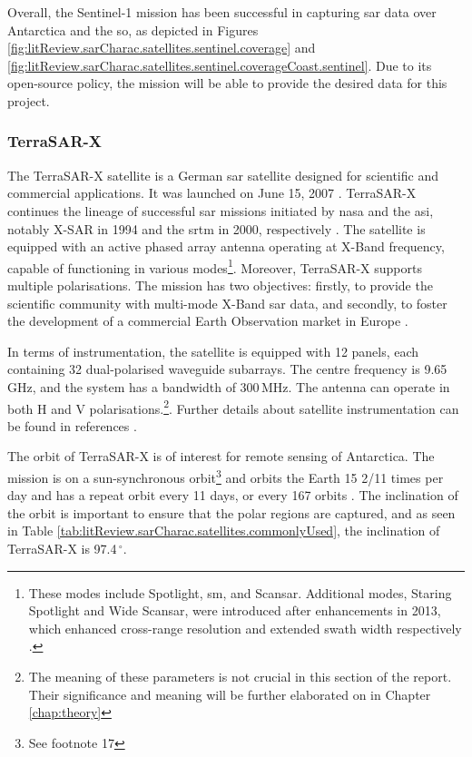 Overall, the Sentinel-1 mission has been successful in capturing \acs{sar} data over Antarctica and the \acs{so}, as depicted in Figures \ref{fig:litReview.sarCharac.satellites.sentinel.coverage} and \ref{fig:litReview.sarCharac.satellites.sentinel.coverageCoast.sentinel}. Due to its open-source policy, the mission will be able to provide the desired data for this project.

\subsubsection{TerraSAR-X} \label{subsubsec:litReview.sarCharac.satellites.terraSAR}

The TerraSAR-X satellite is a German \acs{sar} satellite designed for scientific and commercial applications. It was launched on June 15, 2007 \cite{Werninghaus2004, Werninghaus2010}. TerraSAR-X continues the lineage of successful \acs{sar} missions initiated by \ac{nasa} and the \ac{asi}, notably X-SAR in 1994 and the \ac{srtm} in 2000, respectively \cite{Werninghaus2010}. The satellite is equipped with an active phased array antenna operating at X-Band frequency, capable of functioning in various modes\footnote{These modes include Spotlight, \acf{sm}, and Scan\acs{sar}. Additional modes, Staring Spotlight and Wide Scan\acs{sar}, were introduced after enhancements in 2013, which enhanced cross-range resolution and extended swath width respectively \cite{Buckreuss2018}.}. Moreover, TerraSAR-X supports multiple polarisations. The mission has two objectives: firstly, to provide the scientific community with multi-mode X-Band \acs{sar} data, and secondly, to foster the development of a commercial Earth Observation market in Europe \cite{Werninghaus2004}.

In terms of instrumentation, the satellite is equipped with 12 panels, each containing 32 dual-polarised waveguide subarrays. The centre frequency is 9.65\,GHz, and the system has a bandwidth of 300\,MHz. The antenna can operate in both H and V polarisations.\footnote{The meaning of these parameters is not crucial in this section of the report. Their significance and meaning will be further elaborated on in Chapter \ref{chap:theory}}.\cite{Werninghaus2004} Further details about satellite instrumentation can be found in references \cite{Werninghaus2004, Werninghaus2010}.

The orbit of TerraSAR-X is of interest for remote sensing of Antarctica. The mission is on a sun-synchronous orbit\footnote{See footnote 17} and orbits the Earth 15 2/11 times per day and has a repeat orbit every 11 days, or every 167 orbits \cite{Pitz2010}. The inclination of the orbit is important to ensure that the polar regions are captured, and as seen in Table \ref{tab:litReview.sarCharac.satellites.commonlyUsed}, the inclination of TerraSAR-X is 97.4\,$^{\circ}$. 

